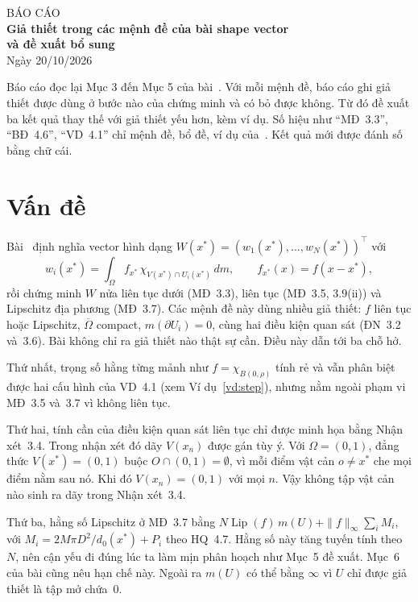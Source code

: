 \documentclass[12pt,a4paper]{article}
\theoremstyle{plain}
\theoremstyle{definition}
\newcommand{\Lip}{\operatorname{Lip}}
\newcommand{\dm}{\,dm}
\begin{document}
\begin{center}
{\large BÁO CÁO}\\[3pt]
{\Large\bfseries Giả thiết trong các mệnh đề của bài shape vector\\ và đề xuất bổ sung}\\[5pt]
Ngày 20/10/2026
\end{center}

Báo cáo đọc lại Mục 3 đến Mục 5 của bài~\cite{huu2026}. Với mỗi mệnh đề, báo cáo ghi giả thiết được dùng ở bước nào của chứng minh và có bỏ được không. Từ đó đề xuất ba kết quả thay thế với giả thiết yếu hơn, kèm ví dụ. Số hiệu như ``MĐ~3.3'', ``BĐ~4.6'', ``VD~4.1'' chỉ mệnh đề, bổ đề, ví dụ của~\cite{huu2026}. Kết quả mới được đánh số bằng chữ cái.

\section{Vấn đề}

Bài~\cite{huu2026} định nghĩa vector hình dạng $W(x^*)=(w_1(x^*),\dots,w_N(x^*))^\top$ với
\[
w_i(x^*)=\int_\Omega f_{x^*}\,\chi_{V(x^*)\cap U_i(x^*)}\dm ,\qquad f_{x^*}(x)=f(x-x^*),
\]
rồi chứng minh $W$ nửa liên tục dưới (MĐ~3.3), liên tục (MĐ~3.5, 3.9(ii)) và Lipschitz địa phương (MĐ~3.7). Các mệnh đề này dùng nhiều giả thiết: $f$ liên tục hoặc Lipschitz, $\overline\Omega$ compact, $m(\partial U_i)=0$, cùng hai điều kiện quan sát (ĐN~3.2 và~3.6). Bài không chỉ ra giả thiết nào thật sự cần. Điều này dẫn tới ba chỗ hở.

Thứ nhất, trọng số hằng từng mảnh như $f=\chi_{B(0,\rho)}$ tính rẻ và vẫn phân biệt được hai cấu hình của VD~4.1 (xem Ví dụ~\ref{vd:step}), nhưng nằm ngoài phạm vi MĐ~3.5 và~3.7 vì không liên tục.

Thứ hai, tính cần của điều kiện quan sát liên tục chỉ được minh họa bằng Nhận xét~3.4. Trong nhận xét đó dãy $V(x_n)$ được gán tùy ý. Với $\Omega=(0,1)$, đẳng thức $V(x^*)=(0,1)$ buộc $O\cap(0,1)=\emptyset$, vì mỗi điểm vật cản $o\neq x^*$ che mọi điểm nằm sau nó. Khi đó $V(x_n)=(0,1)$ với mọi $n$. Vậy không tập vật cản nào sinh ra dãy trong Nhận xét~3.4.

Thứ ba, hằng số Lipschitz ở MĐ~3.7 bằng $N\Lip(f)\,m(U)+\|f\|_\infty\sum_i M_i$, với $M_i=2M\pi D^2/d_0(x^*)+P_i$ theo HQ~4.7. Hằng số này tăng tuyến tính theo $N$, nên cận yếu đi đúng lúc ta làm mịn phân hoạch như Mục~5 đề xuất. Mục~6 của bài cũng nêu hạn chế này. Ngoài ra $m(U)$ có thể bằng $\infty$ vì $U$ chỉ được giả thiết là tập mở chứa~$0$.
\end{document}
